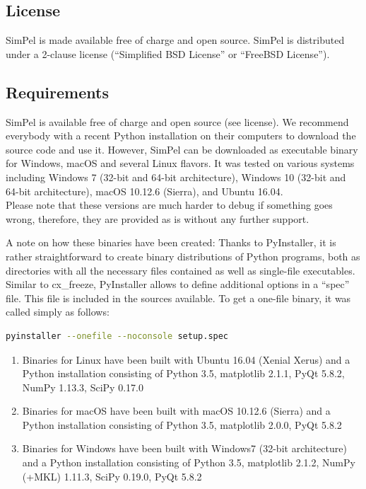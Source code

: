 \documentclass[pdftex,bezier,german,a4,twoside, headexclude,12pt,nochapterprefix, titlepage]{extarticle}
\newcommand{\simpel}{\textsf{SimPel} }
\begin{document}
\subsection{License}
\simpel is made available free of charge and open source. 
\simpel is distributed under a 2-clause license (“Simplified BSD License” or “FreeBSD License”).

\subsection{Requirements}
\simpel is available free of charge and open source (see license). We recommend everybody with a recent Python installation on their computers to download the source code and use it. 
However, 
\simpel can be downloaded as executable binary for Windows, macOS and several Linux flavors.
It was tested on various systems including Windows 7 (32-bit and 64-bit architecture), Windows 10 (32-bit and 64-bit architecture), macOS 10.12.6 (Sierra),
and Ubuntu 16.04.\\

Please note that these versions are much harder to debug if something goes wrong, therefore, they are provided as is without any further support. 



A note on how these binaries have been created: Thanks to PyInstaller, it is rather straightforward to create binary distributions
of Python programs, both as directories with all the necessary files contained as well as single-file executables. 
Similar to cx\_freeze, PyInstaller allows to define additional options in a “spec” file. 
This file is included in the sources available. To get a one-file binary, it was called simply as follows:\\
\begin{lstlisting}[language=bash]
  pyinstaller --onefile --noconsole setup.spec
\end{lstlisting}
\begin{enumerate}
\item Binaries for Linux have been built with Ubuntu 16.04 (Xenial Xerus) and a Python installation consisting of Python 3.5, matplotlib 2.1.1, PyQt 5.8.2,  NumPy 1.13.3, SciPy 0.17.0
\item  Binaries for macOS have been built with macOS 10.12.6 (Sierra) and a Python installation consisting of Python 3.5, matplotlib 2.0.0, PyQt 5.8.2
 \item  Binaries for Windows have been built with Windows7 (32-bit architecture) and a Python installation consisting of Python 3.5, matplotlib 2.1.2, NumPy (+MKL) 1.11.3, SciPy 0.19.0, PyQt 5.8.2
\end{enumerate}
\end{document}
